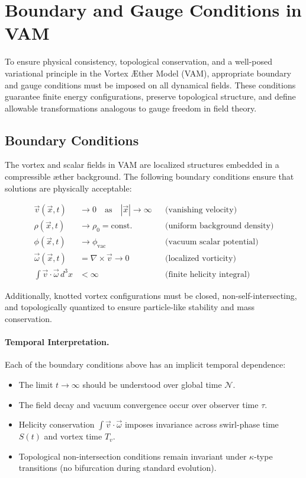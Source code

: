 \section{Boundary and Gauge Conditions in VAM}

To ensure physical consistency, topological conservation, and a well-posed variational principle in the Vortex \AE{}ther Model (VAM), appropriate boundary and gauge conditions must be imposed on all dynamical fields. These conditions guarantee finite energy configurations, preserve topological structure, and define allowable transformations analogous to gauge freedom in field theory.

\subsection{Boundary Conditions}

The vortex and scalar fields in VAM are localized structures embedded in a compressible \ae{}ther background. The following boundary conditions ensure that solutions are physically acceptable:

\begin{align*}
    \vec{v}(\vec{x}, t) &\rightarrow 0 \quad \text{as} \quad |\vec{x}| \rightarrow \infty && \text{(vanishing velocity)} \\
    \rho(\vec{x}, t) &\rightarrow \rho_0 = \text{const.} && \text{(uniform background density)} \\
    \phi(\vec{x}, t) &\rightarrow \phi_{\text{vac}} && \text{(vacuum scalar potential)} \\
    \vec{\omega}(\vec{x}, t) &= \nabla \times \vec{v} \rightarrow 0 && \text{(localized vorticity)} \\
    \int \vec{v} \cdot \vec{\omega} \, d^3x &< \infty && \text{(finite helicity integral)}
\end{align*}

Additionally, knotted vortex configurations must be closed, non-self-intersecting, and topologically quantized to ensure particle-like stability and mass conservation.

\paragraph{Temporal Interpretation.}
Each of the boundary conditions above has an implicit temporal dependence:
\begin{itemize}
    \item The limit $t \to \infty$ should be understood over global time $\mathcal{N}$.
    \item The field decay and vacuum convergence occur over observer time $\tau$.
    \item Helicity conservation $\int \vec{v} \cdot \vec{\omega}$ imposes invariance across swirl-phase time $S(t)$ and vortex time $T_v$.
    \item Topological non-intersection conditions remain invariant under $\kappa$-type transitions (no bifurcation during standard evolution).
\end{itemize}

